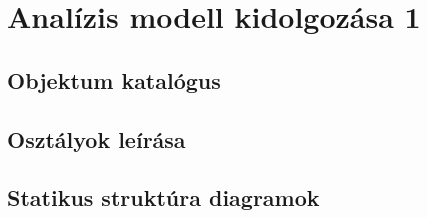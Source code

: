 %
\chapter{Analízis modell kidolgozása 1}

\thispagestyle{fancy}

\section{Objektum katalógus}





\section{Osztályok leírása}



\section{Statikus struktúra diagramok}


